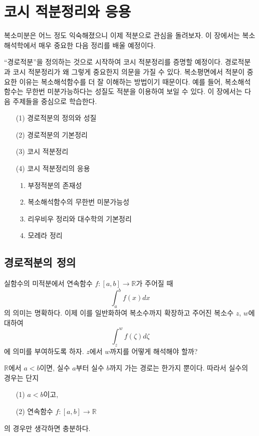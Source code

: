 
\chapter{코시 적분정리와 응용}

복소미분은 어느 정도 익숙해졌으니 이제 적분으로 관심을 돌려보자.
이 장에서는 복소해석학에서 매우 중요한 다음 정리를 배울 예정이다.
\begin{center}
\end{center}
``경로적분''을 정의하는 것으로 시작하여 코시 적분정리를 증명할 예정이다.
경로적분과 코시 적분정리가 왜 그렇게 중요한지 의문을 가질 수 있다.
복소평면에서 적분이 중요한 이유는 복소해석함수를 더 잘 이해하는 방법이기 때문이다.
예를 들어, 복소해석함수는 무한번 미분가능하다는 성질도 적분을 이용하여 보일 수 있다.
이 장에서는 다음 주제들을 중심으로 학습한다.
\begin{enumerate}
\setlength\topsep{0pt}
\setlength\itemsep{0pt}
\item[(1)] 경로적분의 정의와 성질
\item[(2)] 경로적분의 기본정리
\item[(3)] 코시 적분정리
\item[(4)] 코시 적분정리의 응용
\begin{enumerate}
\item 부정적분의 존재성
\item 복소해석함수의 무한번 미분가능성
\item 리우비우 정리와 대수학의 기본정리
\item 모레라 정리
\end{enumerate}
\end{enumerate}

\section{경로적분의 정의}

실함수의 미적분에서 연속함수 $f: [a,b] \to \mathbb R$가 주어질 때
\begin{equation}\label{eq-3-1}
\int_a^b f(x)dx
\end{equation}
의 의미는 명확하다. 이제 이를  일반화하여 복소수까지 확장하고
주어진 복소수 $z$, $w$에 대하여
\[
\int_z^w f(\zeta)d\zeta
\]
에 의미를 부여하도록 하자.
$z$에서 $w$까지를 어떻게 해석해야 할까?

$\mathbb R$에서 $a<b$이면, 실수 $a$부터  실수 $b$까지
가는 경로는 한가지 뿐이다.  
따라서 실수의 경우는 단지
\begin{itemize}
\setlength\itemsep{0pt}
\item[(1)] $a<b$이고,
\item[(2)] 연속함수 $f:[a,b] \to \mathbb R$
\end{itemize}
의 경우만 생각하면 충분하다.

